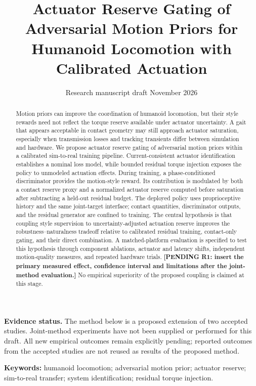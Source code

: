 \documentclass[11pt,a4paper]{article}
\title{Actuator Reserve Gating of Adversarial Motion Priors for Humanoid Locomotion with Calibrated Actuation}
\author{\pending{M1: author list, affiliations and corresponding author}}
\date{Research manuscript draft \quad 4 November 2026}
\newcommand{\pending}[1]{\textbf{[PENDING #1]}}
\begin{document}
\maketitle
\textbf{Evidence status.} The method below is a proposed extension of two accepted studies. Joint-method experiments have not been supplied or performed for this draft. All new empirical outcomes remain explicitly pending; reported outcomes from the accepted studies are not reused as results of the proposed method.

\begin{abstract}
Motion priors can improve the coordination of humanoid locomotion, but their style rewards need not reflect the torque reserve available under actuator uncertainty. A gait that appears acceptable in contact geometry may still approach actuator saturation, especially when transmission losses and tracking transients differ between simulation and hardware. We propose actuator reserve gating of adversarial motion priors within a calibrated sim-to-real training pipeline. Current-consistent actuator identification establishes a nominal loss model, while bounded residual torque injection exposes the policy to unmodeled actuation effects. During training, a phase-conditioned discriminator provides the motion-style reward. Its contribution is modulated by both a contact reserve proxy and a normalized actuator reserve computed before saturation after subtracting a held-out residual budget. The deployed policy uses proprioceptive history and the same joint-target interface; contact quantities, discriminator outputs, and the residual generator are confined to training. The central hypothesis is that coupling style supervision to uncertainty-adjusted actuation reserve improves the robustness--naturalness tradeoff relative to calibrated residual training, contact-only gating, and their direct combination. A matched-platform evaluation is specified to test this hypothesis through component ablations, actuator and latency shifts, independent motion-quality measures, and repeated hardware trials. \pending{R1: insert the primary measured effect, confidence interval and limitations after the joint-method evaluation.} No empirical superiority of the proposed coupling is claimed at this stage.
\end{abstract}
\textbf{Keywords:} humanoid locomotion; adversarial motion prior; actuator reserve; sim-to-real transfer; system identification; residual torque injection.
\end{document}
